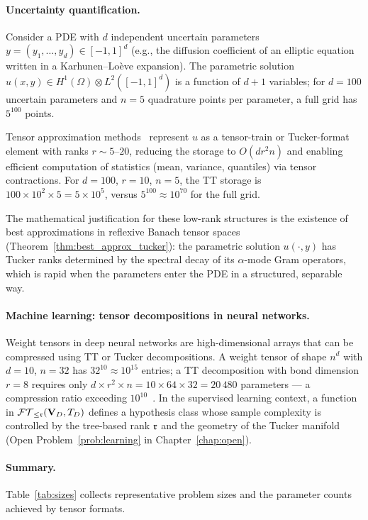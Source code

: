 \paragraph{Uncertainty quantification.}
Consider a PDE with $d$ independent uncertain parameters $y =
(y_1, \ldots, y_d) \in [-1,1]^d$ (e.g., the diffusion coefficient of
an elliptic equation written in a Karhunen--Lo\`{e}ve expansion).
The parametric solution $u(x, y) \in H^1(\Omega) \otimes L^2([-1,1]^d)$
is a function of $d+1$ variables; for $d = 100$ uncertain parameters
and $n = 5$ quadrature points per parameter, a full grid has $5^{100}$
points.

Tensor approximation methods~\cite{Nouy2017,Khoromskij2012} represent
$u$ as a tensor-train or Tucker-format element with ranks
$r \sim 5$--$20$, reducing the storage to $O(d r^2 n)$ and enabling
efficient computation of statistics (mean, variance, quantiles) via
tensor contractions. For $d = 100$, $r = 10$, $n = 5$, the TT storage
is $100 \times 10^2 \times 5 = 5 \times 10^5$, versus $5^{100} \approx
10^{70}$ for the full grid.

The mathematical justification for these low-rank structures is the
existence of best approximations in reflexive Banach tensor spaces
(Theorem~\ref{thm:best_approx_tucker}): the parametric solution
$u(\cdot, y)$ has Tucker ranks determined by the spectral decay of
its $\alpha$-mode Gram operators, which is rapid when the parameters
enter the PDE in a structured, separable way.

\paragraph{Machine learning: tensor decompositions in neural networks.}
Weight tensors in deep neural networks are high-dimensional arrays
that can be compressed using TT or Tucker decompositions. A weight
tensor of shape $n^d$ with $d = 10$, $n = 32$ has $32^{10} \approx
10^{15}$ entries; a TT decomposition with bond dimension $r = 8$
requires only $d \times r^2 \times n = 10 \times 64 \times 32 = 20\,480$
parameters — a compression ratio exceeding $10^{10}$~\cite{Bachmayr2016}.
In the supervised learning context, a function in $\mathcal{FT}_{\leq \mathfrak{r}}(\mathbf{V}_D,T_D)$
defines a hypothesis class whose sample complexity is controlled by the
tree-based rank $\mathfrak{r}$ and the geometry of the Tucker manifold
(Open Problem~\ref{prob:learning} in Chapter~\ref{chap:open}).

\paragraph{Summary.}
Table~\ref{tab:sizes} collects representative problem sizes and the
parameter counts achieved by tensor formats.

